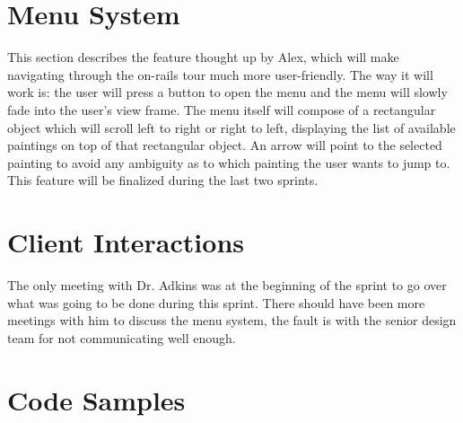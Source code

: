 \section*{Menu System}
This section describes the feature thought up by Alex, which will make navigating through the on-rails tour much more user-friendly.  The way it will work is: the user will press a button to open the menu and the menu will slowly fade into the user's view frame.  The menu itself will compose of a rectangular object which will scroll left to right or right to left, displaying the list of available paintings on top of that rectangular object.  An arrow will point to the selected painting to avoid any ambiguity as to which painting the user wants to jump to.  This feature will be finalized during the last two sprints.

\section*{Client Interactions}
The only meeting with Dr. Adkins was at the beginning of the sprint to go over what was going to be done during this sprint.  There should have been more meetings with him to discuss the menu system, the fault is with the senior design team for not communicating well enough.

\section*{Code Samples}

